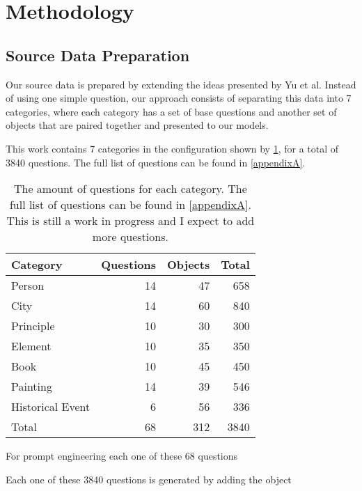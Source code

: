 \section{Methodology}

\newcommand{\cats}{7}
\newcommand{\baseqs}{68}
\newcommand{\things}{312}
\newcommand{\qs}{3840}

\subsection{Source Data Preparation}

Our source data is prepared by extending the ideas presented by Yu et al\cite{factual_recall}.
Instead of using one simple question, our approach consists of separating this data into \cats{} categories, where each category has a set of base questions and another set of objects that are paired together and presented to our models.

This work contains \cats{} categories in the configuration shown by \cref{categories_numbers}, for a total of \qs{} questions.
The full list of questions can be found in \cref{appendixA}.

\begin{table}[h]
	\centering
	\footnotesize
	\begin{tabular}{l | r r r}
		\toprule
		Category & Questions & Objects & Total \\
		\midrule
			Person           & 14 &  47 &  658 \\
			City             & 14 &  60 &  840 \\
			Principle        & 10 &  30 &  300 \\
			Element          & 10 &  35 &  350 \\
			Book             & 10 &  45 &  450 \\
			Painting         & 14 &  39 &  546 \\
			Historical Event & 6  &  56 &  336 \\
		\midrule                    
			Total            & \baseqs{} & \things{} & \qs{} \\
		\bottomrule
	\end{tabular}
	\caption{The amount of questions for each category. The full list of questions can be found in \cref{appendixA}. This is still a work in progress and I expect to add more questions.}
	\label{categories_numbers}
\end{table}

For prompt engineering each one of these \baseqs{} questions 

Each one of these \qs{} questions is generated by adding the object 
